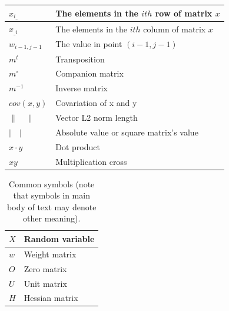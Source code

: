 \documentclass[runningheads,openany]{xhlPaper}
\begin{document}
\begin{table}[t]
\begin{center}
\begin{tabular}{|l|l|}
  $x_{i\_}$ & The elements in the $ith$ row of matrix $x$\\
  \hline
  $x_{\_i}$ & The elements in the $ith$ column of matrix $x$\\
  \hline
  $w_{i-1, j - 1}$ & The value in point $(i - 1, j - 1)$\\
  \hline
  $m^{t}$ & Transposition\\
  \hline
  ${m^ \circ }$ & Companion matrix\\
  \hline
  $m^{-1}$ & Inverse matrix \\
  \hline
  $cov(x, y)$ &  Covariation of x and y\\
  \hline
  $\parallel\quad\parallel$ & Vector L2 norm length\\
  \hline
  $|\quad|$ & Absolute value or square matrix's value\\
  \hline  
  $x \cdot y$ &Dot product\\ 
  \hline
  $xy$ &Multiplication cross\\ 
  \hline
\end{tabular}
\end{center}
\end{table}

\begin{table}[t]
\newcommand{\tabincell}[2]{\begin{tabular}{@{}#1@{}}#2\end{tabular}}
\begin{center}
\caption{Common symbols (note that symbols in main body of text may denote other meaning).} \label{tab:common_symbols}
\begin{tabular}{|l|l|}
  \hline
  $X$ & Random variable\\
  \hline
  $w$ & Weight matrix\\
  \hline
  $O$ & Zero matrix\\
  \hline
  $U$ & Unit matrix\\
  \hline
  $H$ & Hessian matrix\\
  \hline
\end{tabular}
\end{center}
\end{table}
\end{document}
